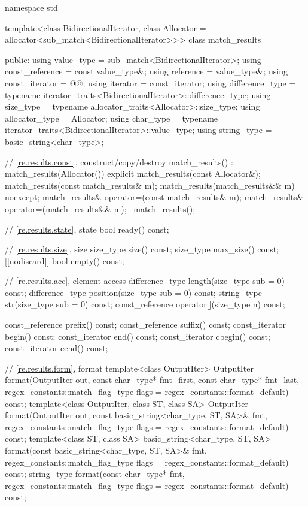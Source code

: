 \begin{codeblock}
namespace std {
  template<class BidirectionalIterator,
           class Allocator = allocator<sub_match<BidirectionalIterator>>>
    class match_results {
    public:
      using value_type      = sub_match<BidirectionalIterator>;
      using const_reference = const value_type&;
      using reference       = value_type&;
      using const_iterator  = @{\impdef}@;
      using iterator        = const_iterator;
      using difference_type =
              typename iterator_traits<BidirectionalIterator>::difference_type;
      using size_type       = typename allocator_traits<Allocator>::size_type;
      using allocator_type  = Allocator;
      using char_type       =
              typename iterator_traits<BidirectionalIterator>::value_type;
      using string_type     = basic_string<char_type>;

      // \ref{re.results.const}, construct/copy/destroy
      match_results() : match_results(Allocator()) {}
      explicit match_results(const Allocator&);
      match_results(const match_results& m);
      match_results(match_results&& m) noexcept;
      match_results& operator=(const match_results& m);
      match_results& operator=(match_results&& m);
      ~match_results();

      // \ref{re.results.state}, state
      bool ready() const;

      // \ref{re.results.size}, size
      size_type size() const;
      size_type max_size() const;
      [[nodiscard]] bool empty() const;

      // \ref{re.results.acc}, element access
      difference_type length(size_type sub = 0) const;
      difference_type position(size_type sub = 0) const;
      string_type str(size_type sub = 0) const;
      const_reference operator[](size_type n) const;

      const_reference prefix() const;
      const_reference suffix() const;
      const_iterator begin() const;
      const_iterator end() const;
      const_iterator cbegin() const;
      const_iterator cend() const;

      // \ref{re.results.form}, format
      template<class OutputIter>
        OutputIter
          format(OutputIter out,
                 const char_type* fmt_first, const char_type* fmt_last,
                 regex_constants::match_flag_type flags = regex_constants::format_default) const;
      template<class OutputIter, class ST, class SA>
        OutputIter
          format(OutputIter out,
                 const basic_string<char_type, ST, SA>& fmt,
                 regex_constants::match_flag_type flags = regex_constants::format_default) const;
      template<class ST, class SA>
        basic_string<char_type, ST, SA>
          format(const basic_string<char_type, ST, SA>& fmt,
                 regex_constants::match_flag_type flags = regex_constants::format_default) const;
      string_type
        format(const char_type* fmt,
               regex_constants::match_flag_type flags = regex_constants::format_default) const;

}}
\end{codeblock}
